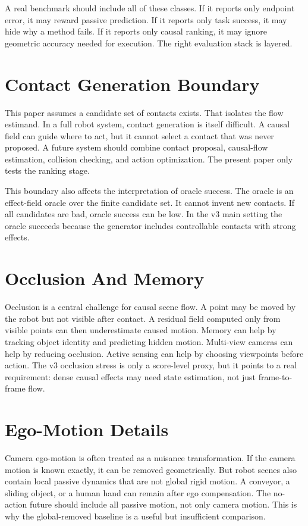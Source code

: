\documentclass{article}
\begin{document}
A real benchmark should include all of these classes.  If it reports only endpoint error,
it may reward passive prediction.  If it reports only task success, it may hide why a
method fails.  If it reports only causal ranking, it may ignore geometric accuracy needed
for execution.  The right evaluation stack is layered.

\section{Contact Generation Boundary}

This paper assumes a candidate set of contacts exists.  That isolates the flow estimand.
In a full robot system, contact generation is itself difficult.  A causal field can guide
where to act, but it cannot select a contact that was never proposed.  A future system
should combine contact proposal, causal-flow estimation, collision checking, and action
optimization.  The present paper only tests the ranking stage.

This boundary also affects the interpretation of oracle success.  The oracle is an
effect-field oracle over the finite candidate set.  It cannot invent new contacts.  If
all candidates are bad, oracle success can be low.  In the v3 main setting the oracle
succeeds because the generator includes controllable contacts with strong effects.

\section{Occlusion And Memory}

Occlusion is a central challenge for causal scene flow.  A point may be moved by the
robot but not visible after contact.  A residual field computed only from visible points
can then underestimate caused motion.  Memory can help by tracking object identity and
predicting hidden motion.  Multi-view cameras can help by reducing occlusion.  Active
sensing can help by choosing viewpoints before action.  The v3 occlusion stress is only a
score-level proxy, but it points to a real requirement: dense causal effects may need
state estimation, not just frame-to-frame flow.

\section{Ego-Motion Details}

Camera ego-motion is often treated as a nuisance transformation.  If the camera motion is
known exactly, it can be removed geometrically.  But robot scenes also contain local
passive dynamics that are not global rigid motion.  A conveyor, a sliding object, or a
human hand can remain after ego compensation.  The no-action future should include all
passive motion, not only camera motion.  This is why the global-removed baseline is a
useful but insufficient comparison.
\end{document}
